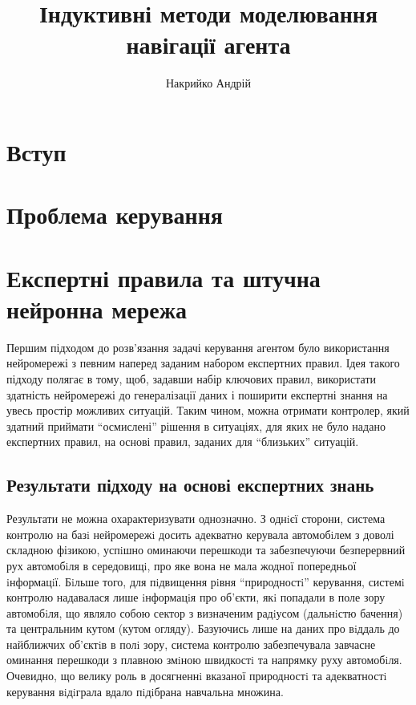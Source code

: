 \documentclass[a4paper,10pt]{article}
\title{Індуктивні методи моделювання навігації агента}
\author{Накрийко Андрій}
\begin{document}
\maketitle

\begin{abstract}

\end{abstract}

\section{Вступ}
\section{Проблема керування}
\section{Експертні правила та штучна нейронна мережа}
Першим підходом до розв'язання задачі керування агентом було використання нейромережі з певним наперед заданим набором експертних правил. Ідея такого підходу полягає в тому, щоб, задавши набір ключових правил, використати здатність нейромережі до генералізації даних і поширити експертні знання на увесь простір можливих ситуацій. Таким чином, можна отримати контролер, який здатний приймати ``осмислені'' рішення в ситуаціях, для яких не було надано експертних правил, на основі правил, заданих для ``близьких'' ситуацій.
\subsection{Результати підходу на основі експертних знань}

Результати не можна охарактеризувати однозначно. З однiєї сторони, система контролю на базi нейромережi досить адекватно керувала автомобiлем з доволі складною фізикою, успiшно оминаючи перешкоди та забезпечуючи безперервний рух автомобiля в середовищi, про яке вона не мала жодної попередньої iнформацiї. Бiльше того, для пiдвищення рiвня “природностi” керування, системi контролю надавалася лише iнформацiя про об’єкти, якi попадали в поле зору автомобiля, що являло собою сектор з визначеним радiусом (дальнiстю бачення) та центральним кутом (кутом огляду). Базуючись лише на даних про вiддаль до найближчих об’єктiв в полi зору, система контролю забезпечувала завчасне оминання перешкоди з плавною змiною швидкостi та напрямку руху автомобiля. Очевидно, що велику роль в досягненнi вказаної природностi та адекватностi керування вiдiграла вдало пiдiбрана навчальна множина.
\end{document}

